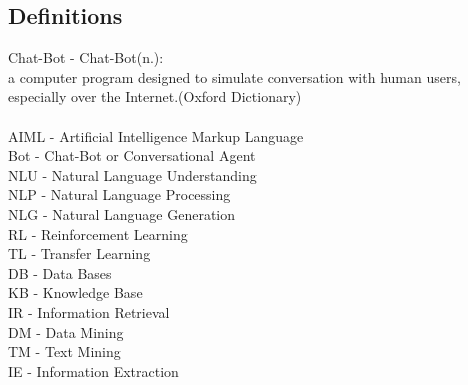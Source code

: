 \documentclass[a4paper,12pt]{article}
\begin{document}
\bigskip
 

\subsection{Definitions}

Chat-Bot - Chat-Bot(n.):\\
a computer program designed to simulate conversation with human users, especially over the Internet.(Oxford Dictionary)\\
\\
AIML - Artificial Intelligence Markup Language\\
Bot - Chat-Bot or Conversational Agent\\
NLU - Natural Language Understanding\\
NLP - Natural Language Processing\\
NLG - Natural Language Generation\\
RL - Reinforcement Learning\\
TL - Transfer Learning\\
DB - Data Bases\\
KB - Knowledge Base\\
IR - Information Retrieval \\
DM - Data Mining\\
TM - Text Mining\\
IE - Information Extraction\\






\end{document}
